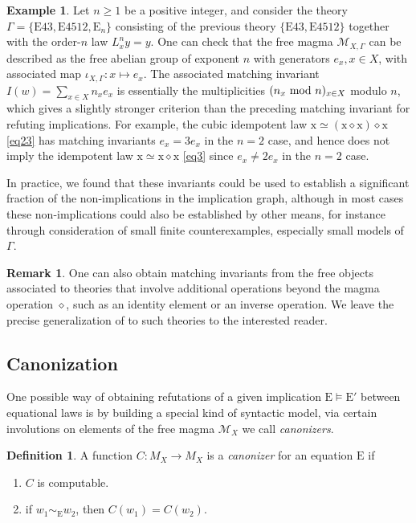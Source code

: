 \documentclass[12pt]{amsart}
\theoremstyle{definition}
\newtheorem{definition}[theorem]{Definition}
\newtheorem{example}[theorem]{Example}
\newtheorem{remark}[theorem]{Remark}
\newcommand{\x}{\mathrm{x}}
\newcommand{\op}{\diamond}
\newcommand{\formaleq}{\simeq}
\newcommand{\Magma}{{\mathcal{M}}}
\newcommand{\Eq}[1]{\mathrm{E}#1}
\newcommand{\E}{\mathrm{E}}
\begin{document}
\begin{example}  Let $n \geq 1$ be a positive integer, and consider the theory $\Gamma = \{\Eq{43}, \Eq{4512}, \E_n\}$ consisting of the previous theory $\{\Eq{43}, \Eq{4512}\}$ together with the order-$n$ law $L_x^n y = y$.  One can check that the free magma $\Magma_{X,\Gamma}$ can be described as the free abelian group of exponent $n$ with generators $e_x, x \in X$, with associated map $\iota_{X,\Gamma} \colon x \mapsto e_x$.  The associated matching invariant $I(w) = \sum_{x \in X} n_x e_x$ is essentially the multiplicities $(n_x \hbox{ mod } n)_{x \in X}$ modulo $n$, which gives a slightly stronger criterion than the preceding matching invariant for refuting implications.  For example, the cubic idempotent law $\x \formaleq (\x \op \x) \op \x$ \eqref{eq23}
has matching invariants $e_x = 3e_x$ in the $n=2$ case, and hence does not imply the idempotent law $\x \formaleq \x \op \x$ \eqref{eq3} since $e_x \neq 2e_x$ in the $n=2$ case.
\end{example}

In practice, we found that these invariants could be used to establish a significant fraction of the non-implications in the implication graph, although in most cases these non-implications could also be established by other means, for instance through consideration of small finite counterexamples, especially small models of~$\Gamma$.

\begin{remark}  One can also obtain matching invariants from the free objects associated to theories that involve additional operations beyond the magma operation $\op$, such as an identity element or an inverse operation.  We leave the precise generalization of  to such theories to the interested reader.
\end{remark}

\subsection{Canonization}\label{canon-sec}

One possible way of obtaining refutations of a given implication $\E \models \E'$ between equational laws is by building a special kind of syntactic model, via certain involutions on elements of the free magma $\Magma_X$ we call \emph{canonizers}.

\begin{definition}
  A function $C\colon M_X\rightarrow M_X$ is a \emph{canonizer} for an equation $\E$ if
  \setlength{\parskip}{0pt}
  \begin{enumerate}
    \item $C$ is computable.
    \item if $w_1\sim_\E w_2$, then $C(w_1) = C(w_2)$.
  \end{enumerate}
\end{definition}
\end{document}
